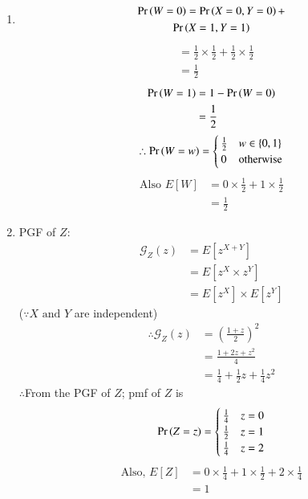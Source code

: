 \documentclass[journal,12pt,twocolumn]{IEEEtran}
\begin{document}
 \begin{enumerate}[label=\alph*)]
\item \begin{multline}
        \Pr\left(W=0\right) = \Pr\left(X=0,Y=0\right)+\\\Pr\left(X=1,Y=1\right)
\end{multline}
\begin{align}
        &= \frac{1}{2}\times\frac{1}{2} + \frac{1}{2}\times\frac{1}{2}\\
        &= \frac{1}{2}
 \end{align}
 \begin{align}
     \Pr\left(W=1\right) &= 1- \Pr\left(W=0\right)\\
              &= \frac{1}{2}
 \end{align}
 \begin{equation}
  \therefore \Pr\left(W=w\right) =
    \begin{cases}
      \frac{1}{2} & w \in \left\{0,1\right\}\\
      0 & \text{otherwise}
    \end{cases}       
\end{equation}
\begin{align}
   \text{Also }E[W] &= 0\times\frac{1}{2} + 1\times\frac{1}{2}\\
                    &= \frac{1}{2} 
\end{align}
\item PGF of $Z$:
\begin{align}
  \mathcal{G}_Z(z) &= E[z^{X+Y}]\\
                   &= E[z^X \times z^Y]\\
                   &= E[z^X]\times E[z^Y] 
\end{align}
($\because X \text{ and } Y$ are independent)
\begin{align}
 \therefore \mathcal{G}_Z(z) &=\left(\frac{1 + z}{2}\right)^2\\
                   &= \frac{1+2z+z^2}{4}\\
                   &= \frac{1}{4} + \frac{1}{2}z + \frac{1}{4}z^2
\end{align}
$\therefore$From the PGF of $Z$; \;pmf of $Z$ is
\begin{align}
    \Pr\left(Z = z\right) = 
\begin{cases}
\frac{1}{4} & z=0
\\
\frac{1}{2} & z=1\\
\frac{1}{4} & z=2
\end{cases}\label{2}
\end{align}
\begin{align}
    \text{Also, } E[Z] &= 0\times\frac{1}{4} + 1\times\frac{1}{2} + 2\times\frac{1}{4}\\
                     &= 1
\end{align}
\end{enumerate}
\end{document}
